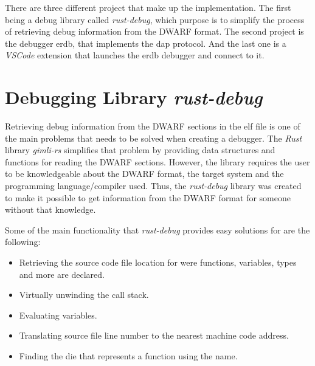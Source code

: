  

There are three different project that make up the implementation.
The first being a debug library called \emph{rust-debug}, which purpose is to simplify the process of retrieving debug information from the \gls{DWARF} format.
The second project is the debugger \gls{erdb}, that implements the \gls{dap} protocol.
And the last one is a \emph{VSCode} extension that launches the \gls{erdb} debugger and connect to it.


\section{Debugging Library \emph{rust-debug}}
\label{section:rust-debug}

Retrieving debug information from the \gls{DWARF} sections in the \gls{elf} file is one of the main problems that needs to be solved when creating a debugger.
The \emph{Rust} library \emph{gimli-rs} simplifies that problem by providing data structures and functions for reading the \gls{DWARF} sections.
However, the library requires the user to be knowledgeable about the \gls{DWARF} format, the target system and the programming language/compiler used.
Thus, the \emph{rust-debug} library was created to make it possible to get information from the \gls{DWARF} format for someone without that knowledge.

Some of the main functionality that \emph{rust-debug} provides easy solutions for are the following:

\begin{itemize}
  \item Retrieving the source code file location for were functions, variables, types and more are declared.
  \item Virtually unwinding the call stack.
  \item Evaluating variables.
  \item Translating source file line number to the nearest machine code address.
  \item Finding the \gls{die} that represents a function using the name.
\end{itemize}

